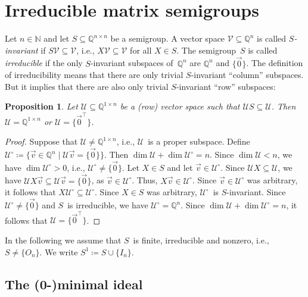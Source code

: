\documentclass{lmcs}
\newtheorem{proposition}[thm]{Proposition}
\theoremstyle{definition}
\newcommand{\N}{\mathbb{N}}
\newcommand{\Q}{\mathbb{Q}}
\newcommand{\U}{\mathcal{U}}
\newcommand{\V}{\mathcal{V}}
\begin{document}
\section{Irreducible matrix semigroups}\label{sec:irreducible}
Let $n \in \N$ and let $S \subseteq \Q^{n \times n}$ be a semigroup.
A vector space $\V \subseteq \Q^n$ is called \emph{$S$-invariant} if $S \V \subseteq \V$, i.e., $X \V \subseteq \V$ for all $X \in S$.
The semigroup~$S$ is called \emph{irreducible} if the only $S$-invariant subspaces of~$\Q^n$ are $\Q^n$ and $\{\vec{0}\}$.
The definition of irreducibility means that there are only trivial $S$-invariant ``column'' subspaces.
But it implies that there are also only trivial $S$-invariant ``row'' subspaces:
\begin{proposition} \label{prop:left-right}
Let $\U \subseteq \Q^{1 \times n}$ be a (row) vector space such that $\U S \subseteq \U$.
Then $\U = \Q^{1 \times n}$ or $\U = \{\vec{0}^\top\}$.
\end{proposition}
\begin{proof}
Suppose that $\U \neq \Q^{1 \times n}$, i.e., $\U$~is a proper subspace.
Define $\U^\circ \coloneqq \{\vec{v} \in \Q^n \mid \U \vec{v} = \{\vec{0}\}\}$.
Then $\dim \U + \dim \U^\circ = n$.
Since $\dim \U < n$, we have $\dim \U^\circ > 0$, i.e., $\U^\circ \ne \{\vec{0}\}$.
Let $X \in S$ and let $\vec{v} \in \U^\circ$.
Since $\U X \subseteq \U$, we have $\U X \vec{v} \subseteq \U \vec{v} = \{\vec{0}\}$, as $\vec{v} \in \U^\circ$.
Thus, $X \vec{v} \in \U^\circ$.
Since $\vec{v} \in \U^\circ$ was arbitrary, it follows that $X \U^\circ \subseteq \U^\circ$.
Since $X \in S$ was arbitrary, $\U^\circ$~is $S$-invariant.
Since $\U^\circ \ne \{\vec{0}\}$ and $S$~is irreducible, we have $\U^\circ = \Q^n$.
Since $\dim \U + \dim \U^\circ = n$, it follows that $\U = \{\vec{0}^\top\}$.
\end{proof}

In the following we assume that $S$~is finite, irreducible and nonzero, i.e., $S \ne \{O_n\}$.
We write $S^1 \coloneqq S \cup \{I_n\}$.

\subsection{The \mbox{(0-)}minimal ideal %
}\label{sub:T}
\end{document}
